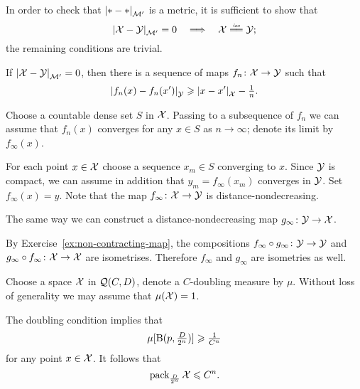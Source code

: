 
In order to check that $\dist{*}{*}{\spc{M}'}$ is a metric, it is sufficient to show that
\[\dist{\spc{X}}{\spc{Y}}{\spc{M}'}=0 
\quad\Longrightarrow\quad
\spc{X}\iso\spc{Y};\]
the remaining conditions are trivial.

If $\dist{\spc{X}}{\spc{Y}}{\spc{M}'}=0$, then there is a sequence of maps $f_n\colon\mathcal{X}\to \mathcal{Y}$ such that 
\[\dist{f_n(x)}{f_n(x')}{\spc{Y}}\ge \dist{x}{x'}{\spc{X}}-\tfrac1n.\]

Choose a countable dense set $S$ in $\mathcal{X}$.
Passing to a subsequence of $f_n$ we can assume that $f_n(x)$ converges for any $x\in S$ as $n\to\infty$;
denote its limit by $f_\infty(x)$.

For each point $x\in\mathcal{X}$ choose a sequence $x_m\in S$ converging to $x$.
Since $\mathcal{Y}$ is compact, we can assume in addition that $y_m=f_\infty(x_m)$ converges in $\mathcal{Y}$.
Set $f_\infty(x)=y$.
Note that the map $f_\infty\colon\mathcal{X}\to \mathcal{Y}$ is  distance-nondecreasing.

The same way we can construct a distance-nondecreasing map 
$g_\infty\colon\mathcal{Y}\to \mathcal{X}$.

By Exercise~\ref{ex:non-contracting-map}, the compositions $f_\infty\circ g_\infty\colon\mathcal{Y}\to \mathcal{Y}$ and $g_\infty\z\circ f_\infty\:\spc{X}\to \spc{X}$ are isometrises.
Therefore $f_\infty$ and $g_\infty$ are isometries as well.



Choose a space $\mathcal{X}$ in $\mathcal{Q}(C,D)$, denote a $C$-doubling measure by $\mu$.
Without loss of generality we may assume that $\mu(\spc{X})\z=1$.

The doubling condition implies that 
\[\mu[\mathrm{B}{}(p,\tfrac D{2^n})]\geqslant\tfrac 1{C^n}\]
for any point $x\in \mathcal{X}$.
It follows that 
\[\operatorname{\rm pack}\nolimits_{\frac D{2^n}}\mathcal{X}\leqslant C^n.\]

